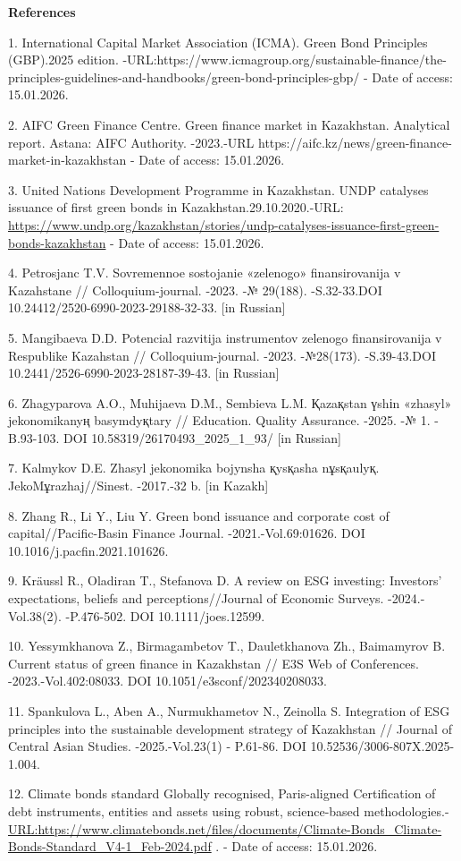 \begin{center}
{\bfseries References}
\end{center}

\begin{refs}
1. International Capital Market Association (ICMA). Green Bond
Principles (GBP).2025 edition.
-URL:https://www.icmagroup.org/sustainable-finance/the-principles-guidelines-and-handbooks/green-bond-principles-gbp/
- Date of access: 15.01.2026.

2. AIFC Green Finance Centre. Green finance market in Kazakhstan.
Analytical report. Astana: AIFC Authority. -2023.-URL
https://aifc.kz/news/green-finance-market-in-kazakhstan - Date of
access: 15.01.2026.

3. United Nations Development Programme in Kazakhstan. UNDP catalyses
issuance of first green bonds in Kazakhstan.29.10.2020.-URL:
\url{https://www.undp.org/kazakhstan/stories/undp-catalyses-issuance-first-green-bonds-kazakhstan}
- Date of access: 15.01.2026.

4. Petrosjanc T.V. Sovremennoe sostojanie «zelenogo» finansirovanija v
Kazahstane // Colloquium-journal. -2023. -№ 29(188). -S.32-33.DOI
10.24412/2520-6990-2023-29188-32-33. {[}in Russian{]}

5. Mangibaeva D.D. Potencial razvitija instrumentov zelenogo
finansirovanija v Respublike Kazahstan // Colloquium-journal. -2023.
-№28(173). -S.39-43.DOI 10.2441/2526-6990-2023-28187-39-43. {[}in
Russian{]}

6. Zhagyparova A.O., Muhijaeva D.M., Sembieva L.M. Қazaқstan үshіn
«zhasyl» jekonomikanyң basymdyқtary // Education. Quality Assurance.
-2025. -№ 1. -B.93-103. DOI 10.58319/26170493\_2025\_1\_93/ {[}in
Russian{]}

7. Kalmykov D.E. Zhasyl jekonomika bojynsha қysқasha nұsқaulyқ.
JekoMұrazhaj//Sinest. -2017.-32 b. {[}in Kazakh{]}

8. Zhang R., Li Y., Liu Y. Green bond issuance and corporate cost of
capital//Pacific-Basin Finance Journal. -2021.-Vol.69:01626. DOI
10.1016/j.pacfin.2021.101626.

9. Kräussl R., Oladiran T., Stefanova D. A review on ESG investing:
Investors' expectations, beliefs and perceptions//Journal of Economic
Surveys. -2024.-Vol.38(2). -P.476-502. DOI 10.1111/joes.12599.

10. Yessymkhanova Z., Birmagambetov T., Dauletkhanova Zh., Baimamyrov B.
Current status of green finance in Kazakhstan // E3S Web of Conferences.
-2023.-Vol.402:08033. DOI 10.1051/e3sconf/202340208033.

11. Spankulova L., Aben A., Nurmukhametov N., Zeinolla S. Integration of
ESG principles into the sustainable development strategy of Kazakhstan
// Journal of Central Asian Studies. -2025.-Vol.23(1) - P.61-86. DOI
10.52536/3006-807X.2025-1.004.

12. Сlimate bonds standard Globally recognised, Paris-aligned
Certification of debt instruments, entities and assets using robust,
science-based methodologies.-
\url{URL:https://www.climatebonds.net/files/documents/Climate-Bonds_Climate-Bonds-Standard_V4-1_Feb-2024.pdf}
. - Date of access: 15.01.2026.
\end{refs}

